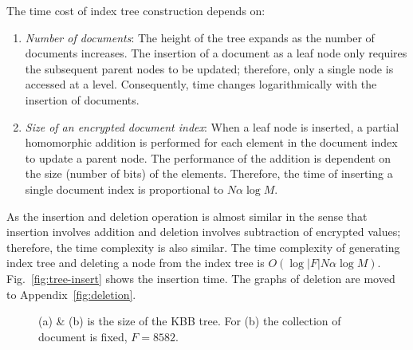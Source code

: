 \documentclass[sigconf,pdftex]{acmart}
\begin{document}
The time cost of index tree construction depends on:
\begin{enumerate}
    \item \textit{Number of documents}: The height of the tree expands as the number of documents increases. The insertion of a document as a leaf node only requires the subsequent parent nodes to be updated; therefore, only a single node is accessed at a level. Consequently, time changes logarithmically with the insertion of documents.
    
    \item \textit{Size of an encrypted document index}: When a leaf node is inserted, a partial homomorphic addition is performed for each element in the document index to update a parent node. The performance of the addition is dependent on the size (number of bits) of the elements. Therefore, the time of inserting a single document index is proportional to $N\alpha \log{M}$.
\end{enumerate}

 As the insertion and deletion operation is almost similar in the sense that insertion involves addition and deletion involves subtraction of encrypted values; therefore, the time complexity is also similar. The time complexity of generating index tree and deleting a node from the index tree is $O( \log{|F|} N \alpha \log{M})$. Fig.~\ref{fig:tree-insert} shows the insertion time. The graphs of deletion are moved to Appendix~\ref{fig:deletion}.
 
 \begin{figure}[htpb]
        
    \hfill
  \caption{\small{(a) \& (b) is the size of the KBB tree. For (b) the collection of document is fixed, $F= 8582$.}}
  \label{fig:tree-size} 
\end{figure}
\end{document}

